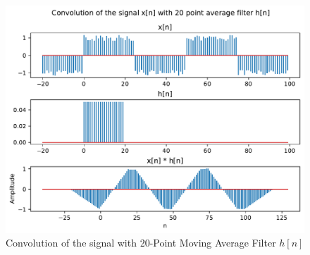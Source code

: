 \documentclass[10pt,a4paper, margin=1in]{article}
\begin{document}
\begin{enumerate}
\begin{enumerate}
    \begin{figure}[!htb]
    \centering
    \includegraphics[width=1\textwidth]{q7/7b_convolution20.pdf}
    \caption{Convolution of the signal with 20-Point Moving Average Filter $h[n]$}
    \label{fig:figure2}
    \end{figure}
    \end{enumerate}    

\end{enumerate}
\end{document}
